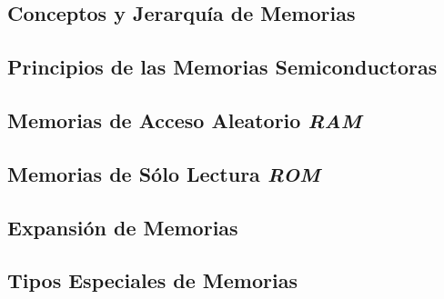 \subsection{Conceptos y Jerarquía de Memorias}
\subsection{Principios de las Memorias Semiconductoras}
\subsection{Memorias de Acceso Aleatorio \textit{RAM}}
\subsection{Memorias de Sólo Lectura \textit{ROM}}
\subsection{Expansión de Memorias}
\subsection{Tipos Especiales de Memorias}